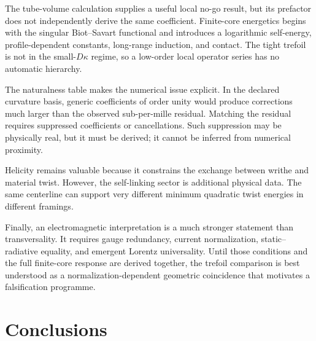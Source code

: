 \documentclass[aps,pre,preprint,notitlepage,nofootinbib,superscriptaddress]{revtex4-2}
\begin{document}
The tube-volume calculation supplies a useful local no-go result, but its prefactor does not independently derive the same coefficient.  Finite-core energetics begins with the singular Biot--Savart functional and introduces a logarithmic self-energy, profile-dependent constants, long-range induction, and contact.  The tight trefoil is not in the small-$D\kappa$ regime, so a low-order local operator series has no automatic hierarchy.

The naturalness table makes the numerical issue explicit.  In the declared curvature basis, generic coefficients of order unity would produce corrections much larger than the observed sub-per-mille residual.  Matching the residual requires suppressed coefficients or cancellations.  Such suppression may be physically real, but it must be derived; it cannot be inferred from numerical proximity.

Helicity remains valuable because it constrains the exchange between writhe and material twist.  However, the self-linking sector is additional physical data.  The same centerline can support very different minimum quadratic twist energies in different framings.

Finally, an electromagnetic interpretation is a much stronger statement than transversality.  It requires gauge redundancy, current normalization, static--radiative equality, and emergent Lorentz universality.  Until those conditions and the full finite-core response are derived together, the trefoil comparison is best understood as a normalization-dependent geometric coincidence that motivates a falsification programme.

\section{Conclusions}
\end{document}
